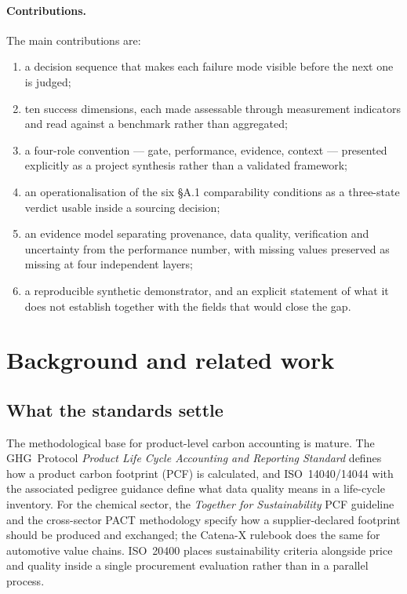 \documentclass[10pt,twocolumn,a4paper]{article}
\begin{document}
\paragraph{Contributions.} The main contributions are:
\begin{enumerate}[label=\arabic*.]
  \item a decision sequence that makes each failure mode visible before the next
        one is judged;
  \item ten success dimensions, each made assessable through measurement
        indicators and read against a benchmark rather than aggregated;
  \item a four-role convention --- gate, performance, evidence, context ---
        presented explicitly as a project synthesis rather than a validated
        framework;
  \item an operationalisation of the six \S A.1 comparability conditions as a
        three-state verdict usable inside a sourcing decision;
  \item an evidence model separating provenance, data quality, verification and
        uncertainty from the performance number, with missing values preserved as
        missing at four independent layers;
  \item a reproducible synthetic demonstrator, and an explicit statement of what
        it does not establish together with the fields that would close the gap.
\end{enumerate}

\section{Background and related work}

\subsection{What the standards settle}

The methodological base for product-level carbon accounting is mature. The
GHG~Protocol \emph{Product Life Cycle Accounting and Reporting Standard}
\cite{p1} defines how a product carbon footprint (PCF) is calculated, and
ISO~14040/14044 with the associated pedigree guidance \cite{a2} define what data
quality means in a life-cycle inventory. For the chemical sector, the
\emph{Together for Sustainability} PCF guideline \cite{b1} and the cross-sector
PACT methodology \cite{p3,b2} specify how a supplier-declared footprint should be
produced and exchanged; the Catena-X rulebook \cite{b3} does the same for
automotive value chains. ISO~20400 \cite{a1} places sustainability criteria
alongside price and quality inside a single procurement evaluation rather than in
a parallel process.
\end{document}

